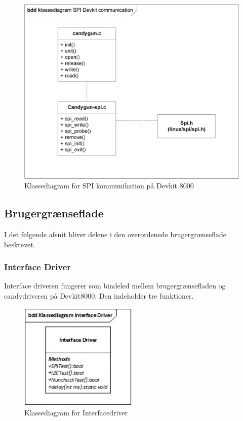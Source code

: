 \begin{figure}[H]
	\centering
	\includegraphics[width=\textwidth]{Afsnit/DesignOgImplementering/images/SPIklasse}
	\caption{Klassediagram for SPI kommunikation på Devkit 8000}
	\label{fig:spiklasse}
\end{figure}

   
\subsection{Brugergrænseflade}
I det følgende afsnit bliver delene i den overordenede brugergrænseflade beskrevet.

\subsubsection{Interface Driver}
Interface driveren fungerer som bindeled mellem brugergrænsefladen og candydriveren på Devkit8000. Den indeholder tre funktioner.

\begin{figure}[H]
	\centering
	\includegraphics[width=0.5\textwidth]{Afsnit/DesignOgImplementering/images/InterfacedriverKlassediagram}
	\caption{Klassediagram for Interfacedriver}
	\label{fig:idriverclass}
\end{figure}

